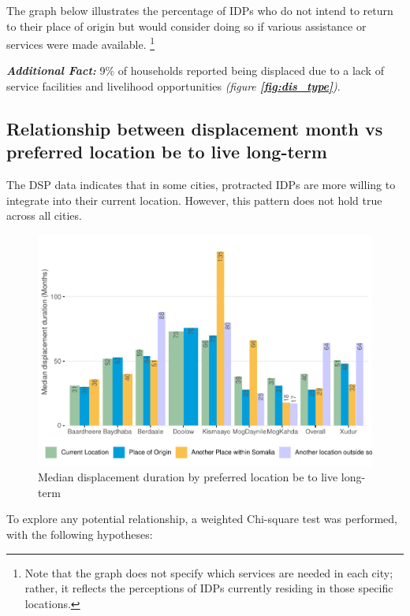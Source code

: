 \documentclass[
]{article}
\begin{document}
The graph below illustrates the percentage of IDPs who do not intend to
return to their place of origin but would consider doing so if various
assistance or services were made available. \footnote{Note that the
  graph does not specify which services are needed in each city; rather,
  it reflects the perceptions of IDPs currently residing in those
  specific locations.}

\textbf{\emph{Additional Fact:}} 9\% of households reported being
displaced due to a lack of service facilities and livelihood
opportunities \emph{(figure
\textbf{\textcolor{blue}{\ref{fig:dis_type}}})}.

\subsection{Relationship between displacement month vs preferred
location be to live
long-term}\label{relationship-between-displacement-month-vs-preferred-location-be-to-live-long-term}

The DSP data indicates that in some cities, protracted IDPs are more
willing to integrate into their current location. However, this pattern
does not hold true across all cities.

\begin{figure}[H]

{\centering \includegraphics[width=0.8\linewidth,height=0.8\textheight]{climate_vs_conflict_files/figure-latex/unnamed-chunk-5-1} 

}

\caption{Median displacement duration by preferred location be to live long-term}\label{fig:unnamed-chunk-5}
\end{figure}

To explore any potential relationship, a weighted Chi-square test was
performed, with the following hypotheses:
\end{document}
